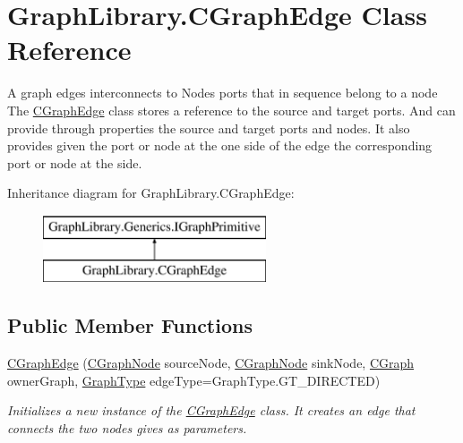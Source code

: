 \hypertarget{class_graph_library_1_1_c_graph_edge}{}\section{Graph\+Library.\+C\+Graph\+Edge Class Reference}
\label{class_graph_library_1_1_c_graph_edge}


A graph edges interconnects to Nodes ports that in sequence belong to a node The \hyperlink{class_graph_library_1_1_c_graph_edge}{C\+Graph\+Edge} class stores a reference to the source and target ports. And can provide through properties the source and target ports and nodes. It also provides given the port or node at the one side of the edge the corresponding port or node at the side.  


Inheritance diagram for Graph\+Library.\+C\+Graph\+Edge\+:\begin{figure}[H]
\begin{center}
\leavevmode
\includegraphics[height=2.000000cm]{class_graph_library_1_1_c_graph_edge}
\end{center}
\end{figure}
\subsection*{Public Member Functions}
\begin{DoxyCompactItemize}
\item 
\hyperlink{class_graph_library_1_1_c_graph_edge_a38f5e03ba556824dc271a9873b981d50}{C\+Graph\+Edge} (\hyperlink{class_graph_library_1_1_c_graph_node}{C\+Graph\+Node} source\+Node, \hyperlink{class_graph_library_1_1_c_graph_node}{C\+Graph\+Node} sink\+Node, \hyperlink{class_graph_library_1_1_c_graph}{C\+Graph} owner\+Graph, \hyperlink{namespace_graph_library_1_1_generics_a1bac729ea88e6f3925406df33f15d056}{Graph\+Type} edge\+Type=Graph\+Type.\+G\+T\+\_\+\+D\+I\+R\+E\+C\+T\+E\+D)
\begin{DoxyCompactList}\small\item\em Initializes a new instance of the \hyperlink{class_graph_library_1_1_c_graph_edge}{C\+Graph\+Edge} class. It creates an edge that connects the two nodes gives as parameters. \end{DoxyCompactList}\end{DoxyCompactItemize}
